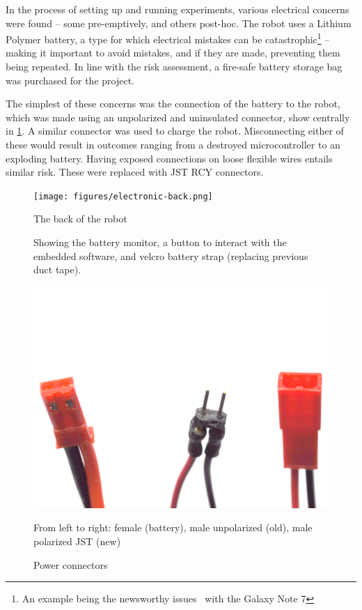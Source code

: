 \documentclass[main.tex]{subfiles}
\begin{document}
In the process of setting up and running experiments, various electrical concerns were found -- some pre-emptively, and others post-hoc. The robot uses a Lithium Polymer battery, a type for which electrical mistakes can be catastrophic\footnote{An example being the newsworthy issues~\cite{bbc-samsung-explosion} with the Galaxy Note 7} -- making it important to avoid mistakes, and if they are made, preventing them being repeated. In line with the risk assessment, a fire-safe battery storage bag was purchased for the project.

The simplest of these concerns was the connection of the battery to the robot, which was made using an unpolarized and uninsulated connector, show centrally in \cref{fig:connectors}. A similar connector was used to charge the robot. Misconnecting either of these would result in outcomes ranging from a destroyed microcontroller to an exploding battery. Having exposed connections on loose flexible wires entails similar risk. These were replaced with JST RCY connectors.

\begin{figure}
	\begin{minipage}[t]{0.6\linewidth - 1em}
		\centering
		\texttt{[image: figures/electronic-back.png]}
		\caption{The back of the robot}
		\label{fig:robot-back}
		\medskip
		\small
		Showing the battery monitor, a button to interact with the embedded software, and velcro battery strap
		(replacing previous duct tape).
	\end{minipage}\hfill
	\begin{minipage}[t]{0.4\linewidth - 1em}
		\centering
		\includegraphics[width=\linewidth]{figures/battery-connectors.png}
		\caption{Power connectors}
		\label{fig:connectors}
		\medskip
		\small
		From left to right: female (battery), male unpolarized (old), male polarized JST (new)
	\end{minipage}
\end{figure}
\end{document}
